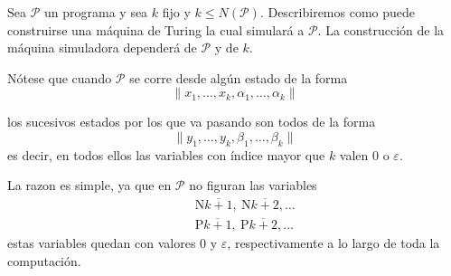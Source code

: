 \begin{frame}
	\PN Sea $\mathcal{P}$ un programa y sea $k$ fijo y $k \leq N(\mathcal{P})$. Describiremos como puede construirse una
	máquina de Turing la cual simulará a $\mathcal{P}$. La construcción de la máquina simuladora dependerá de
	$\mathcal{P}$ y de $k$.

	\PN Nótese que cuando $\mathcal{P}$ se corre desde algún estado de la forma
	\begin{equation*}
		\lVert x_{1}, \dotsc, x_{k}, \alpha_{1}, \dotsc, \alpha_{k} \rVert
	\end{equation*}

	\PN los sucesivos estados por los que va pasando son todos de la forma
	\begin{equation*}
		\lVert y_{1}, \dotsc, y_{k}, \beta_{1}, \dotsc, \beta_{k} \rVert
	\end{equation*}
	\PN es decir, en todos ellos las variables con índice mayor que $k$ valen $0$ o $\varepsilon$.

	\PN La razon es simple, ya que en $\mathcal{P}$ no figuran las variables
	\begin{eqnarray*}
		&&\mathrm{N}\overline{k+1}, \ \mathrm{N}\overline{k+2}, \dotsc \\
		&&\mathrm{P}\overline{k+1}, \ \mathrm{P}\overline{k+2}, \dotsc
	\end{eqnarray*}
	\PN estas variables quedan con valores $0$ y $\varepsilon$, respectivamente a lo largo de toda la computación.
\end{frame}
